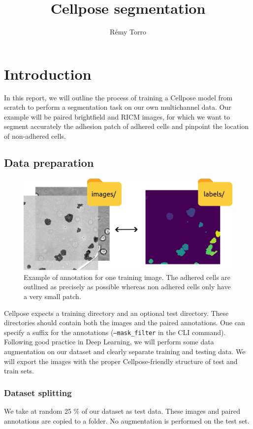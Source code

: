 \documentclass[tikz,10pt,a4paper]{article}
\title{Cellpose segmentation}
\author{Rémy Torro}
\begin{document}
	\maketitle
	\section{Introduction}
	In this report, we will outline the process of training a Cellpose model from scratch to perform a segmentation task on our own multichannel data. Our example will be paired brightfield and RICM images, for which we want to segment accurately the adhesion patch of adhered cells and pinpoint the location of non-adhered cells. 
	\subsection{Data preparation}
	\begin{figure}[h!]
		\centering
		\includegraphics{dataset.png}
		\caption{Example of annotation for one training image. The adhered cells are outlined as precisely as possible whereas non adhered cells only have a very small patch.}
	\end{figure}
	Cellpose expects a training directory and an optional test directory. These directories should contain both the images and the paired annotations. One can specify a suffix for the annotations (\texttt{--mask_filter} in the CLI command). Following good practice in Deep Learning, we will perform some data augmentation on our dataset and clearly separate training and testing data. We will export the images with the proper Cellpose-friendly structure of test and train sets.
	
	\subsubsection{Dataset splitting}
	
	\par{} We take at random 25 \% of our dataset as test data. These images and paired annotations are copied to a  folder. No augmentation is performed on the test set. 
	
\end{document}
